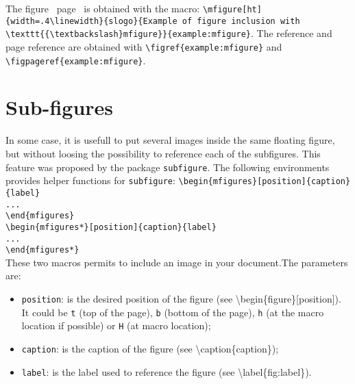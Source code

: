 \documentclass[book]{upmethodology-document}
\begin{document}
The figure~ page~ is obtained with the macro: \texttt{{\textbackslash}mfigure[ht]\{width=.4{\textbackslash}linewidth\}\{slogo\}\{Example of figure inclusion with {\textbackslash}texttt\{\{{\textbackslash}textbackslash\}mfigure\}\}\{example:mfigure\}}. The reference and page reference are obtained with \texttt{{\textbackslash}figref\{example:mfigure\}} and \texttt{{\textbackslash}figpageref\{example:mfigure\}}.


\section{Sub-figures}

In some case, it is usefull to put several images inside the same floating figure, but without loosing the possibility to reference each of the subfigures. This feature was proposed by the package \texttt{subfigure}. The following environments provides helper functions for \texttt{subfigure}:
\texttt{{\textbackslash}begin\{mfigures\}[position]\{caption\}\{label\}\\
...\\
{\textbackslash}end\{mfigures\}} \\
\texttt{{\textbackslash}begin\{mfigures*\}[position]\{caption\}\{label\}\\
...\\
{\textbackslash}end\{mfigures*\}} \\

These two macros permits to include an image in your document.The parameters are:
\begin{itemize}
\item \texttt{position}: is the desired position of the figure (see {\textbackslash}begin\{figure\}[position]). It could be \texttt{t} (top of the page), \texttt{b} (bottom of the page), \texttt{h} (at the macro location if possible) or \texttt{H} (at macro location);

\item \texttt{caption}: is the caption of the figure (see {\textbackslash}caption\{caption\});

\item \texttt{label}: is the label used to reference the figure (see {\textbackslash}label\{fig:label\}).
\end{itemize}
\end{document}
